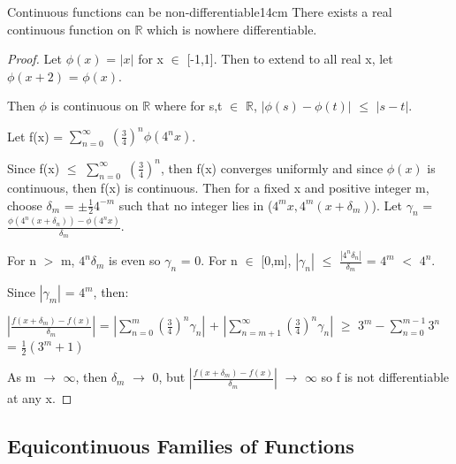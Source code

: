     \newpage



    \begin{wtheorem}{Continuous functions can be non-differentiable}{14cm}
        There exists a real continuous function on $\mathbb{R}$ which is
        nowhere differentiable.
    \end{wtheorem}

    \begin{proof}
        Let $\phi(x)$ = $|x|$ for x $\in$ [-1,1].
        Then to extend to all real x, let $\phi(x+2)$ = $\phi(x)$.

        Then $\phi$ is continuous on $\mathbb{R}$ where for s,t $\in$ $\mathbb{R}$,
        $|\phi(s) - \phi(t)|$ $\leq$ $|s-t|$.

        Let f(x) = $\sum_{n=0}^{\infty}$ $(\frac{3}{4})^n \phi(4^n x)$.


        Since f(x) $\leq$ $\sum_{n=0}^{\infty}$ $(\frac{3}{4})^n$, then f(x)
        converges uniformly and since $\phi(x)$ is continuous, then f(x)
        is continuous.
        Then for a fixed x and positive integer m, choose
        $\delta_m$ = $\pm \frac{1}{2} 4^{-m}$ such that
        no integer lies in ($4^mx, 4^m(x+\delta_m)$).
        Let $\gamma_n$ = $\frac{\phi(4^n(x+\delta_n)) - \phi(4^nx)}{\delta_m}$.
        
        For n $>$ m, $4^n\delta_m$ is even so $\gamma_n$ = 0.
        For n $\in$ [0,m], $|\gamma_n|$ $\leq$ $\frac{|4^n\delta_n|}{\delta_m}$
        = $4^m$ $<$ $4^n$.

        Since $|\gamma_m|$ = $4^m$, then:

        \hspace{0.5cm}
        $|\frac{f(x+\delta_m) - f(x)}{\delta_m}|$
        = $|\sum_{n=0}^m (\frac{3}{4})^n \gamma_n|$
            + $|\sum_{n=m+1}^{\infty} (\frac{3}{4})^n \gamma_n|$
        $\geq$ $3^m - \sum_{n=0}^{m-1} 3^n$
        = $\frac{1}{2}(3^m + 1)$
        
        As m $\rightarrow$ $\infty$, then $\delta_m$ $\rightarrow$ 0, but
        $|\frac{f(x+\delta_m) - f(x)}{\delta_m}|$ $\rightarrow$ $\infty$
        so f is not differentiable at any x.
    \end{proof}

    \vspace{0.5cm}





\subsection[ Equicontinuous ]{ Equicontinuous Families of Functions }

